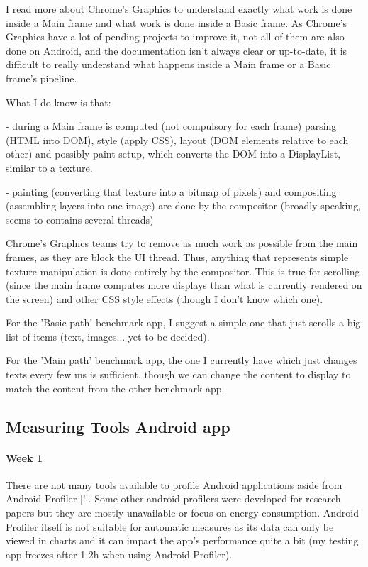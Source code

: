 \documentclass{kththesis}
\newcommand{\citationneeded}{\todo{Citation needed}[!]}
\begin{document}
I read more about Chrome's Graphics to understand exactly what work is done inside a  Main frame and what work is done inside a Basic frame. As Chrome's Graphics have a lot of pending projects to improve it, not all of them are also done on Android, and the documentation isn't always clear or up-to-date, it is difficult to really understand what happens inside a Main frame or a Basic frame's pipeline.

What I do know is that:

    - during a Main frame is computed (not compulsory for each frame) parsing (HTML into DOM), style (apply CSS), layout (DOM elements relative to each other) and possibly paint setup, which converts the DOM into a DisplayList, similar to a texture.

    - painting (converting that texture into a bitmap of pixels) and compositing (assembling layers into one image) are done by the compositor (broadly speaking, seems to contains several threads)

Chrome's Graphics teams try to remove as much work as possible from the main frames, as they are block the UI thread. Thus, anything that represents simple texture manipulation is done entirely by the compositor. This is true for scrolling (since the main frame computes more displays than what is currently rendered on the screen) and other CSS style effects (though I don't know which one).

For the 'Basic path' benchmark app, I suggest a simple one that just scrolls a big list of items (text, images... yet to be decided).

For the 'Main path' benchmark app, the one I currently have which just changes texts every few ms is sufficient, though we can change the content to display to match the content from the other benchmark app.




\subsection{Measuring Tools Android app}
\paragraph{Week 1}
 There are not many tools available to profile Android applications aside from Android Profiler \citationneeded. Some other android profilers were developed for research papers but they are mostly unavailable or focus on energy consumption. Android Profiler itself is not suitable for automatic measures as its data can only be viewed in charts and it can impact the app's performance quite a bit (my testing app freezes after 1-2h when using Android Profiler).
\end{document}
